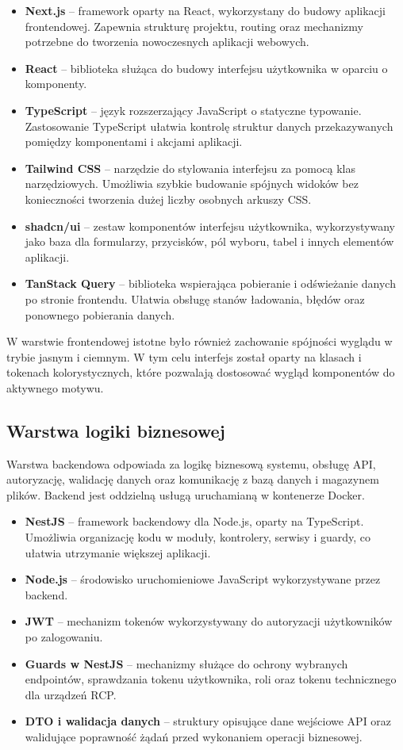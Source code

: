 \begin{itemize}
    \item \textbf{Next.js} -- framework oparty na React, wykorzystany do budowy aplikacji frontendowej. Zapewnia strukturę projektu, routing oraz mechanizmy potrzebne do tworzenia nowoczesnych aplikacji webowych.
    \item \textbf{React} -- biblioteka służąca do budowy interfejsu użytkownika w oparciu o komponenty.
    \item \textbf{TypeScript} -- język rozszerzający JavaScript o statyczne typowanie. Zastosowanie TypeScript ułatwia kontrolę struktur danych przekazywanych pomiędzy komponentami i akcjami aplikacji.
    \item \textbf{Tailwind CSS} -- narzędzie do stylowania interfejsu za pomocą klas narzędziowych. Umożliwia szybkie budowanie spójnych widoków bez konieczności tworzenia dużej liczby osobnych arkuszy CSS.
    \item \textbf{shadcn/ui} -- zestaw komponentów interfejsu użytkownika, wykorzystywany jako baza dla formularzy, przycisków, pól wyboru, tabel i innych elementów aplikacji.
    \item \textbf{TanStack Query} -- biblioteka wspierająca pobieranie i odświeżanie danych po stronie frontendu. Ułatwia obsługę stanów ładowania, błędów oraz ponownego pobierania danych.
\end{itemize}

W warstwie frontendowej istotne było również zachowanie spójności wyglądu w trybie jasnym i ciemnym. W tym celu interfejs został oparty na klasach i tokenach kolorystycznych, które pozwalają dostosować wygląd komponentów do aktywnego motywu.

\subsection{Warstwa logiki biznesowej}

Warstwa backendowa odpowiada za logikę biznesową systemu, obsługę API, autoryzację, walidację danych oraz komunikację z bazą danych i magazynem plików. Backend jest oddzielną usługą uruchamianą w kontenerze Docker.

\begin{itemize}
    \item \textbf{NestJS} -- framework backendowy dla Node.js, oparty na TypeScript. Umożliwia organizację kodu w moduły, kontrolery, serwisy i guardy, co ułatwia utrzymanie większej aplikacji.
    \item \textbf{Node.js} -- środowisko uruchomieniowe JavaScript wykorzystywane przez backend.
    \item \textbf{JWT} -- mechanizm tokenów wykorzystywany do autoryzacji użytkowników po zalogowaniu.
    \item \textbf{Guards w NestJS} -- mechanizmy służące do ochrony wybranych endpointów, sprawdzania tokenu użytkownika, roli oraz tokenu technicznego dla urządzeń RCP.
    \item \textbf{DTO i walidacja danych} -- struktury opisujące dane wejściowe API oraz walidujące poprawność żądań przed wykonaniem operacji biznesowej.
\end{itemize}

